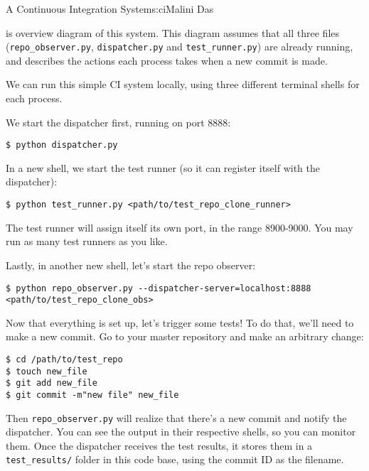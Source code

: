 \begin{aosachapter}{A Continuous Integration System}{s:ci}{Malini Das}
\label{control-flow-diagram}

 is overview diagram of this system.
This diagram assumes that all three files (\texttt{repo\_observer.py},
\texttt{dispatcher.py} and \texttt{test\_runner.py}) are already
running, and describes the actions each process takes when a new commit
is made.


\label{running-the-code}

We can run this simple CI system locally, using three different terminal
shells for each process.

We start the dispatcher first, running on port 8888:

\begin{verbatim}
$ python dispatcher.py
\end{verbatim}

In a new shell, we start the test runner (so it can register itself with
the dispatcher):

\begin{verbatim}
$ python test_runner.py <path/to/test_repo_clone_runner>
\end{verbatim}

The test runner will assign itself its own port, in the range 8900-9000.
You may run as many test runners as you like.

Lastly, in another new shell, let's start the repo observer:

\begin{verbatim}
$ python repo_observer.py --dispatcher-server=localhost:8888 <path/to/test_repo_clone_obs>
\end{verbatim}

Now that everything is set up, let's trigger some tests! To do that,
we'll need to make a new commit. Go to your master repository and make
an arbitrary change:

\begin{verbatim}
$ cd /path/to/test_repo
$ touch new_file
$ git add new_file
$ git commit -m"new file" new_file
\end{verbatim}

Then \texttt{repo\_observer.py} will realize that there's a new commit
and notify the dispatcher. You can see the output in their respective
shells, so you can monitor them. Once the dispatcher receives the test
results, it stores them in a \texttt{test\_results/} folder in this code
base, using the commit ID as the filename.


\end{aosachapter}
